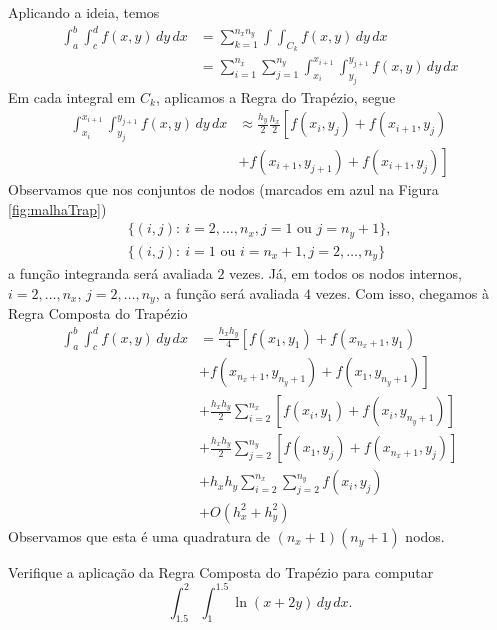 Aplicando a ideia, temos
\begin{align}
  \int_a^b\int_c^d f(x,y)\,dy\,dx &= \sum_{k=1}^{n_xn_y}\int\int_{C_k} f(x,y)\,dy\,dx\\
                                  &= \sum_{i=1}^{n_x}\sum_{j=1}^{n_y}\int_{x_i}^{x_{i+1}}\int_{y_j}^{y_{j+1}} f(x,y)\,dy\,dx
\end{align}
Em cada integral em $C_k$, aplicamos a Regra do Trapézio, segue
\begin{align}
  \int_{x_i}^{x_{i+1}}\int_{y_j}^{y_{j+1}} f(x,y)\,dy\,dx &\approx \frac{h_y}{2}\frac{h_x}{2}\left[f(x_i,y_j) + f(x_{i+1},y_j)\right.\\
                                                          &+ \left.f(x_{i+1},y_{j+1}) + f(x_{i+1},y_{j})\right]
\end{align}
Observamos que nos conjuntos de nodos (marcados em azul na Figura \ref{fig:malhaTrap})
\begin{gather}
  \{(i,j):~i=2,\dotsc,n_x,j=1\text{ ou }j=n_y+1\},\\
  \{(i,j):~i=1\text{ ou }i=n_x+1,j=2,\dotsc,n_y\}
\end{gather}
a função integranda será avaliada $2$ vezes. Já, em todos os nodos internos, $i=2,\dotsc,n_x$, $j=2,\dotsc,n_y$, a função será avaliada $4$ vezes. Com isso, chegamos à Regra Composta do Trapézio
\begin{align}
  \int_a^b\int_c^d f(x,y)\,dy\,dx &= \frac{h_xh_y}{4}\left[f(x_1,y_1)+f(x_{n_x+1},y_1)\right.\nonumber\\
                                  &\left. + f(x_{n_x+1},y_{n_y+1})+f(x_{1},y_{n_y+1})\right]\nonumber\\
                                  &+ \frac{h_xh_y}{2}\sum_{i=2}^{n_x}\left[f(x_i,y_1) + f(x_i,y_{n_y+1})\right]\nonumber\\
                                  &+ \frac{h_xh_y}{2}\sum_{j=2}^{n_y}\left[f(x_1,y_j) + f(x_{n_x+1},y_j)\right]\nonumber\\
                                  &+ h_xh_y\sum_{i=2}^{n_x}\sum_{j=2}^{n_y}f(x_i,y_j)\nonumber\\
                                  &+ O(h_x^2 + h_y^2)
\end{align}
Observamos que esta é uma quadratura de $(n_x+1)(n_y+1)$ nodos.

\begin{exer}
  Verifique a aplicação da Regra Composta do Trapézio para computar
  \begin{equation}
    \int_{1.5}^{2}\int_{1}^{1.5}\ln(x + 2y)\,dy\,dx.
  \end{equation}
\end{exer}

